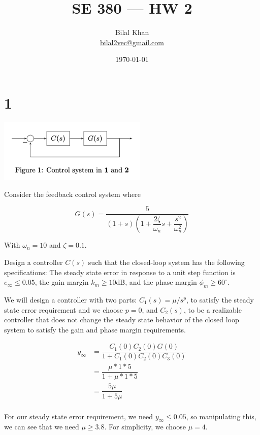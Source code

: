 \documentclass[11pt]{article}
\title{SE 380 — HW 2}
\author{Bilal Khan\\
\href{mailto:bilal2vec@gmail.com}{bilal2vec@gmail.com}}
\date{\today}
\begin{document}
\maketitle

\tableofcontents

\section{1}

\includegraphics[width=200pt]{a4_1.png}

Consider the feedback control system where

\[ G(s) = \dfrac{5}{(1 + s) \left(1 + \dfrac{2 \zeta}{\omega_n} s + \dfrac{s^2}{\omega_n^2} \right)} \]

With $\omega_n = 10$ and $\zeta = 0.1$.

Design a controller $C(s)$ such that the closed-loop system has the following specifications: The steady state error in response to a unit step function is $e_\infty \leq 0.05$, the gain margin $k_m \geq 10$dB, and the phase margin $\phi_m \geq 60^\circ$.

We will design a controller with two parts: $C_1(s) = \mu / s^p$, to satisfy the steady state error requirement and we choose $p = 0$, and $C_2(s)$, to be a realizable controller that does not change the steady state behavior of the closed loop system to satisfy the gain and phase margin requirements.

\begin{align*}  
  y_\infty &= \dfrac{C_1(0)C_2(0)G(0)}{1 + C_1(0) C_2(0) C_3(0)} \\
  &= \dfrac{\mu * 1 * 5}{1 + \mu * 1 * 5} \\
  &= \dfrac{5 \mu}{1 + 5 \mu} \\
\end{align*}

For our steady state error requirement, we need $y_\infty \leq 0.05$, so manipulating this, we can see that we need $\mu \geq 3.8$. For simplicity, we choose $\mu = 4$.
\end{document}
